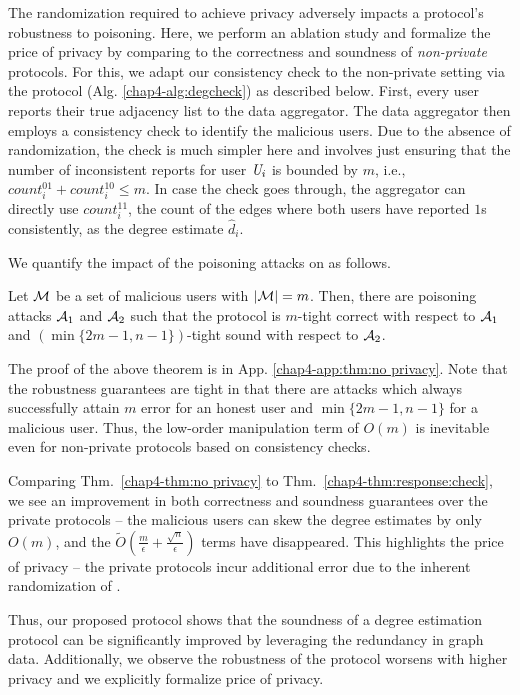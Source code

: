The randomization required to achieve privacy adversely impacts a protocol's robustness to poisoning. Here, we perform an ablation study and formalize the price of privacy by comparing to the correctness and soundness of \textit{non-private} protocols. For this, we adapt our consistency check to the non-private setting via the \DegCheck{} protocol (Alg. \ref{chap4-alg:degcheck}) as described below. First, every user reports their true adjacency list to the data aggregator. The data aggregator then employs a consistency check to identify the malicious users. Due to the absence of randomization, the check is much simpler here and involves just ensuring that the number of inconsistent reports for user $\textit{U}_i$ is bounded by $m$, i.e., $count_i^{01}+count_i^{10} \leq m $. In case the check goes through, the aggregator can directly use $count_i^{11}$, the count of the edges where both users have reported $1$s consistently, as the degree estimate $\hat{d}_i$.

We quantify the impact of the poisoning attacks on  \DegCheck{} as follows.

\begin{thm}
Let $\mathcal{M}$ be a set of malicious users with $|\mathcal{M}| = m$. Then, there are poisoning attacks $\mathcal{A}_1$ and $\mathcal{A}_2$ such that
the \DegCheck{} protocol is $m$-tight correct with respect to $\mathcal{A}_1$ and $(\min\{2m-1,n-1\})$-tight sound with respect to $\mathcal{A}_2$. \label{chap4-thm:no privacy}
\end{thm}
The proof of the above theorem is in App. \ref{chap4-app:thm:no privacy}.
Note that the robustness guarantees are tight in that there are attacks which always successfully attain $m$ error for an honest user and $\min\{2m-1,n-1\}$ for a malicious user. Thus, the low-order manipulation term of $O(m)$ is inevitable  even for non-private protocols based on consistency checks. %

Comparing Thm.~\ref{chap4-thm:no privacy} to Thm.~\ref{chap4-thm:response:check}, we see an improvement in both correctness and soundness guarantees over the private protocols -- the malicious users can skew the degree estimates by only $O(m)$, and the $\tilde{O}(\frac{m}{\epsilon} + \frac{\sqrt{n}}{\epsilon})$ terms have disappeared. This highlights the price of privacy -- the private protocols incur additional error due to the inherent randomization of \ldp.

Thus, our proposed \DegRRCheck{} protocol shows that the soundness of a degree estimation protocol can be significantly improved by leveraging the redundancy in graph data. Additionally, we observe the robustness of the protocol worsens with higher privacy and we explicitly formalize price of privacy. 
